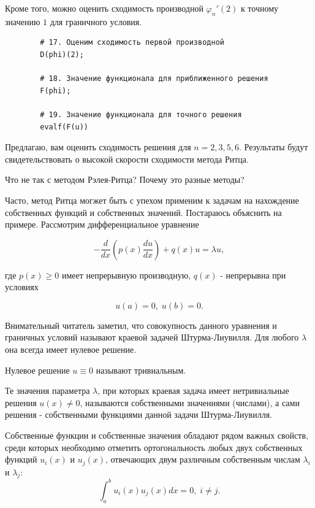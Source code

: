 \documentclass{article}
\begin{document}
\noindent Кроме того, можно оценить сходимость производной $\varphi_{n}'(2)$ к точному значению $1$ для граничного условия.

\begin{commandline}
	\begin{verbatim}
		# 17. Оценим сходимость первой производной
		D(phi)(2);

		# 18. Значение функционала для приближенного решения
		F(phi);

		# 19. Значение функционала для точного решения
		evalf(F(u))
	\end{verbatim}
\end{commandline}

\noindent Предлагаю, вам оценить сходимость решения для $n = 2, 3, 5, 6$. Результаты будут свидетельствовать о высокой скорости сходимости метода Ритца.

\newpage
\begin{question}
	Что не так с методом Рэлея-Ритца? Почему это разные методы?
\end{question}

Часто, метод Ритца могжет быть с упехом применим к задачам на нахождение собственных функций и собственных значений. Постараюсь объяснить на примере. Рассмотрим дифференциальное уравнение

\begin{displaymath}
	- \frac{d}{dx} \left( p(x) \frac{du}{dx} \right) + q(x)u = \lambda u,
\end{displaymath}

\noindent где $p(x) \geq 0$ имеет непрерывную производную, $q(x)$ - непрерывна при условиях

\begin{displaymath}
	u(a) = 0, \; u(b) = 0.
\end{displaymath}

Внимательный читатель заметил, что совокупность данного уравнения и граничных условий называют краевой задачей Штурма-Лиувилля. Для любого $\lambda$ она всегда имеет нулевое решение.

\begin{info}
	Нулевое решение $u \equiv 0$ называют тривиальным.
\end{info}

Те значения параметра $\lambda$, при которых краевая задача имеет нетривиальные решения $u(x) \neq 0$, называются собственными значениями (числами), а сами решения - собственными функциями данной задачи Штурма-Лиувилля.

\begin{info}
	Собственные функции и собственные значения обладают рядом важных свойств, среди которых необходимо отметить ортогональность любых двух собственных функций $u_{i}(x)$ и $u_{j}(x)$, отвечающих двум различным собственным числам $\lambda_{i}$ и $\lambda_{j}$:
	\begin{displaymath}
		\int_{a}^{b} u_{i}(x) u_{j}(x) dx = 0, \; i \neq j.
	\end{displaymath}
\end{info}
\end{document}
